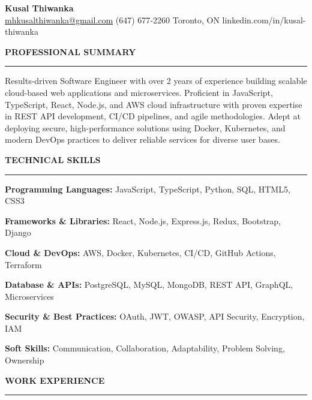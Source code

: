 \documentclass[10pt,letterpaper]{article}
\begin{document}
\begin{center}
{\LARGE\textbf{Kusal Thiwanka}}\\[3pt]
\href{mailto:mhkusalthiwanka@gmail.com}{mhkusalthiwanka@gmail.com}\hspace{2em}%
(647) 677{-}2260\hspace{2em}%
Toronto, ON\hspace{2em}
linkedin.com/in/kusal-thiwanka
\end{center}

\vspace{6pt}

\textbf{PROFESSIONAL SUMMARY}\\[-8pt]
\noindent\rule{\textwidth}{1pt}

\vspace{-2pt}

Results-driven Software Engineer with over 2 years of experience building scalable cloud-based web applications and microservices. Proficient in JavaScript, TypeScript, React, Node.js, and AWS cloud infrastructure with proven expertise in REST API development, CI/CD pipelines, and agile methodologies. Adept at deploying secure, high-performance solutions using Docker, Kubernetes, and modern DevOps practices to deliver reliable services for diverse user bases.

\vspace{8pt}

\textbf{TECHNICAL SKILLS}\\[-8pt]
\noindent\rule{\textwidth}{1pt}

\vspace{-2pt}

\textbf{Programming Languages:} JavaScript, TypeScript, Python, SQL, HTML5, CSS3

\textbf{Frameworks \& Libraries:} React, Node.js, Express.js, Redux, Bootstrap, Django

\textbf{Cloud \& DevOps:} AWS, Docker, Kubernetes, CI/CD, GitHub Actions, Terraform

\textbf{Database \& APIs:} PostgreSQL, MySQL, MongoDB, REST API, GraphQL, Microservices

\textbf{Security \& Best Practices:} OAuth, JWT, OWASP, API Security, Encryption, IAM

\textbf{Soft Skills:} Communication, Collaboration, Adaptability, Problem Solving, Ownership

\vspace{8pt}

\textbf{WORK EXPERIENCE}\\[-8pt]
\noindent\rule{\textwidth}{1pt}
\end{document}
